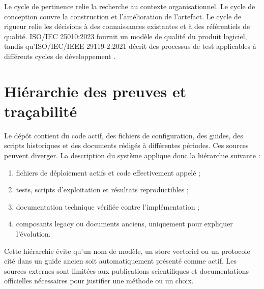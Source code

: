 Le cycle de pertinence relie la recherche au contexte organisationnel. Le cycle de conception couvre la construction et l'amélioration de l'artefact. Le cycle de rigueur relie les décisions à des connaissances existantes et à des référentiels de qualité. ISO/IEC 25010:2023 fournit un modèle de qualité du produit logiciel, tandis qu'ISO/IEC/IEEE 29119-2:2021 décrit des processus de test applicables à différents cycles de développement \citep{ISO25010_2023,ISO29119_2_2021}.

\section{Hiérarchie des preuves et traçabilité}

Le dépôt contient du code actif, des fichiers de configuration, des guides, des scripts historiques et des documents rédigés à différentes périodes. Ces sources peuvent diverger. La description du système applique donc la hiérarchie suivante :

\begin{enumerate}
    \item fichiers de déploiement actifs et code effectivement appelé ;
    \item tests, scripts d'exploitation et résultats reproductibles ;
    \item documentation technique vérifiée contre l'implémentation ;
    \item composants legacy ou documents anciens, uniquement pour expliquer l'évolution.
\end{enumerate}

Cette hiérarchie évite qu'un nom de modèle, un store vectoriel ou un protocole cité dans un guide ancien soit automatiquement présenté comme actif. Les sources externes sont limitées aux publications scientifiques et documentations officielles nécessaires pour justifier une méthode ou un choix.
